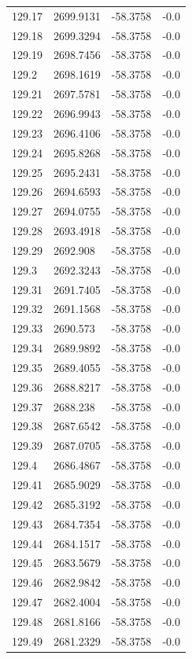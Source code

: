 \begin{table}[H]
\begin{tabular}{llll}
129.17 & 2699.9131 & -58.3758 & -0.0 \\
129.18 & 2699.3294 & -58.3758 & -0.0 \\
129.19 & 2698.7456 & -58.3758 & -0.0 \\
129.2 & 2698.1619 & -58.3758 & -0.0 \\
129.21 & 2697.5781 & -58.3758 & -0.0 \\
129.22 & 2696.9943 & -58.3758 & -0.0 \\
129.23 & 2696.4106 & -58.3758 & -0.0 \\
129.24 & 2695.8268 & -58.3758 & -0.0 \\
129.25 & 2695.2431 & -58.3758 & -0.0 \\
129.26 & 2694.6593 & -58.3758 & -0.0 \\
129.27 & 2694.0755 & -58.3758 & -0.0 \\
129.28 & 2693.4918 & -58.3758 & -0.0 \\
129.29 & 2692.908 & -58.3758 & -0.0 \\
129.3 & 2692.3243 & -58.3758 & -0.0 \\
129.31 & 2691.7405 & -58.3758 & -0.0 \\
129.32 & 2691.1568 & -58.3758 & -0.0 \\
129.33 & 2690.573 & -58.3758 & -0.0 \\
129.34 & 2689.9892 & -58.3758 & -0.0 \\
129.35 & 2689.4055 & -58.3758 & -0.0 \\
129.36 & 2688.8217 & -58.3758 & -0.0 \\
129.37 & 2688.238 & -58.3758 & -0.0 \\
129.38 & 2687.6542 & -58.3758 & -0.0 \\
129.39 & 2687.0705 & -58.3758 & -0.0 \\
129.4 & 2686.4867 & -58.3758 & -0.0 \\
129.41 & 2685.9029 & -58.3758 & -0.0 \\
129.42 & 2685.3192 & -58.3758 & -0.0 \\
129.43 & 2684.7354 & -58.3758 & -0.0 \\
129.44 & 2684.1517 & -58.3758 & -0.0 \\
129.45 & 2683.5679 & -58.3758 & -0.0 \\
129.46 & 2682.9842 & -58.3758 & -0.0 \\
129.47 & 2682.4004 & -58.3758 & -0.0 \\
129.48 & 2681.8166 & -58.3758 & -0.0 \\
129.49 & 2681.2329 & -58.3758 & -0.0 \\

\end{tabular}
\end{table}
